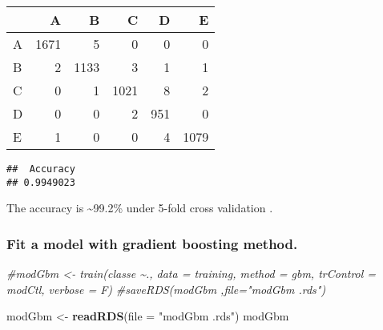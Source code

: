 \documentclass[
]{article}
\newenvironment{Shaded}{\begin{snugshade}}{\end{snugshade}}
\newcommand{\AttributeTok}[1]{\textcolor[rgb]{0.13,0.29,0.53}{#1}}
\newcommand{\CommentTok}[1]{\textcolor[rgb]{0.56,0.35,0.01}{\textit{#1}}}
\newcommand{\DecValTok}[1]{\textcolor[rgb]{0.00,0.00,0.81}{#1}}
\newcommand{\FunctionTok}[1]{\textcolor[rgb]{0.13,0.29,0.53}{\textbf{#1}}}
\newcommand{\NormalTok}[1]{#1}
\newcommand{\OtherTok}[1]{\textcolor[rgb]{0.56,0.35,0.01}{#1}}
\newcommand{\SpecialCharTok}[1]{\textcolor[rgb]{0.81,0.36,0.00}{\textbf{#1}}}
\newcommand{\StringTok}[1]{\textcolor[rgb]{0.31,0.60,0.02}{#1}}
\begin{document}
\begin{Shaded}
\end{Shaded}

\begin{tabular}{l|r|r|r|r|r}
\hline
  & A & B & C & D & E\\
\hline
A & 1671 & 5 & 0 & 0 & 0\\
\hline
B & 2 & 1133 & 3 & 1 & 1\\
\hline
C & 0 & 1 & 1021 & 8 & 2\\
\hline
D & 0 & 0 & 2 & 951 & 0\\
\hline
E & 1 & 0 & 0 & 4 & 1079\\
\hline
\end{tabular}

\begin{Shaded}
\end{Shaded}

\begin{verbatim}
##  Accuracy 
## 0.9949023
\end{verbatim}

The accuracy is \textasciitilde99.2\% under 5-fold cross validation .

\hypertarget{fit-a-model-with-gradient-boosting-method.}{%
\subsubsection{Fit a model with gradient boosting
method.}\label{fit-a-model-with-gradient-boosting-method.}}

\begin{Shaded}
\begin{Highlighting}[]
\CommentTok{\#modGbm \textless{}{-} train(classe \textasciitilde{}., data = training, method = \textquotesingle{}gbm\textquotesingle{}, trControl = modCtl, verbose = F)}
\CommentTok{\#saveRDS(modGbm ,file="modGbm .rds")}

\NormalTok{modGbm  }\OtherTok{\textless{}{-}} \FunctionTok{readRDS}\NormalTok{(}\AttributeTok{file =} \StringTok{"modGbm .rds"}\NormalTok{)}
\NormalTok{modGbm }
\end{Highlighting}
\end{Shaded}
\end{document}

